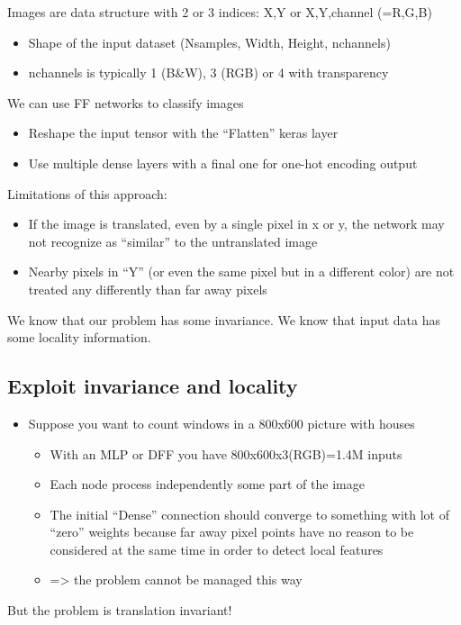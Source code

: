 Images are data structure with 2 or 3 indices: X,Y or X,Y,channel (=R,G,B)
\begin{itemize}
	\item Shape of the input dataset (Nsamples, Width, Height, nchannels)
	\item nchannels is typically 1 (B\&W), 3 (RGB) or 4 with transparency
\end{itemize}
We can use FF networks to classify images
\begin{itemize}
	\item Reshape the input tensor with the “Flatten” keras layer
	\item Use multiple dense layers with a final one for one-hot encoding output
\end{itemize}
Limitations of this approach:
\begin{itemize}
	\item If the image is translated, even by a single pixel in x or y, the network may not recognize as “similar” to the untranslated image
	\item Nearby pixels in “Y” (or even the same pixel but in a different color) are not treated any differently than far away pixels
\end{itemize}
We know that our problem has some invariance. We know that input data has some locality information.

\subsection{Exploit invariance and locality}

\begin{itemize}
	\item Suppose you want to count windows in a 800x600	picture with houses
	\begin{itemize}
		\item With an MLP or DFF you have 800x600x3(RGB)=1.4M inputs
		\item Each node process independently some part of the image
		\item The initial “Dense” connection should converge to something with lot of “zero” weights because far away pixel points have no reason to be considered at the same time in order to detect	local features
		\item => the problem cannot be managed this way
	\end{itemize}
\end{itemize}

But the problem is translation invariant!

